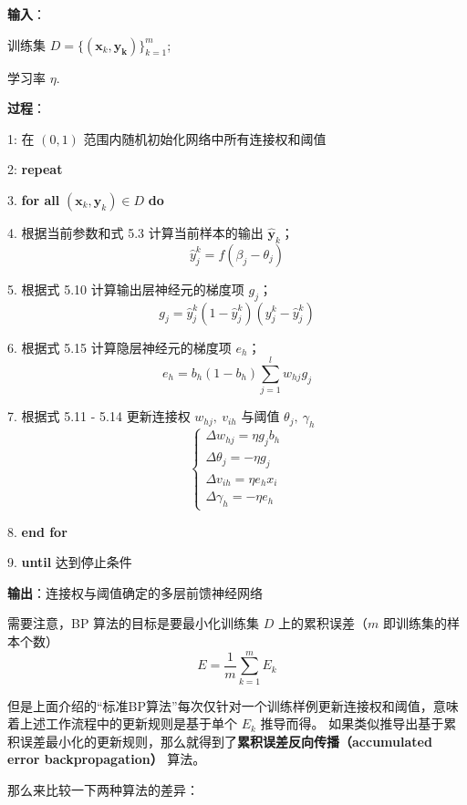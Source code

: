 \documentclass[../studies-ml.tex]{subfiles}
\begin{document}
\begin{shaded}
  \textbf{输入}：

  训练集 $D = \{(\pmb{x}_k, \pmb{y_k})\}_{k=1}^m$;

  学习率 $\eta$.
  \bigskip

  \textbf{过程}：

  1: 在 $(0,1)$ 范围内随机初始化网络中所有连接权和阈值

  2: \textbf{repeat}

  3. \aidnt \textbf{for all} $(\pmb{x}_k, \pmb{y}_k) \in D$ \textbf{do}

  4. \aidnt[2] 根据当前参数和式 5.3 计算当前样本的输出 $\hat{\pmb{y}}_k$；
  \[ \hat{y}_j^k = f(\beta_j - \theta_j) \]

  5. \aidnt[2] 根据式 5.10 计算输出层神经元的梯度项 $g_j$；
  \[ g_j = \hat{y}_j^k (1 - \hat{y}_j^k) (y_j^k - \hat{y}_j^k) \]

  6. \aidnt[2] 根据式 5.15 计算隐层神经元的梯度项 $e_h$；
  \[ e_h = b_h (1 - b_h) \sum_{j=1}^{l} w_{hj} g_j \]

  7. \aidnt[2] 根据式 5.11 - 5.14 更新连接权 $w_{hj},\ v_{ih}$ 与阈值 $\theta_j,\ \gamma_h$
  \begin{equation*}
    \begin{cases}
      \Delta w_{hj} = \eta g_j b_h \\
      \Delta \theta_j = -\eta g_j  \\
      \Delta v_{ih} = \eta e_h x_i \\
      \Delta \gamma_h = -\eta e_h
    \end{cases}
  \end{equation*}

  8. \aidnt \textbf{end for}

  9. \textbf{until} 达到停止条件

  \textbf{输出}：连接权与阈值确定的多层前馈神经网络
\end{shaded}

需要注意，BP 算法的目标是要最小化训练集 $D$ 上的累积误差（$m$ 即训练集的样本个数）
\begin{equation}
  E = \frac{1}{m} \sum_{k=1}^{m} E_k
\end{equation}

但是上面介绍的“标准BP算法”每次仅针对一个训练样例更新连接权和阈值，意味着上述工作流程中的更新规则是基于单个 $E_k$ 推导而得。
如果类似推导出基于累积误差最小化的更新规则，那么就得到了\textbf{累积误差反向传播（accumulated error backpropagation）}
算法。

\bigbreak
那么来比较一下两种算法的差异：
\end{document}
